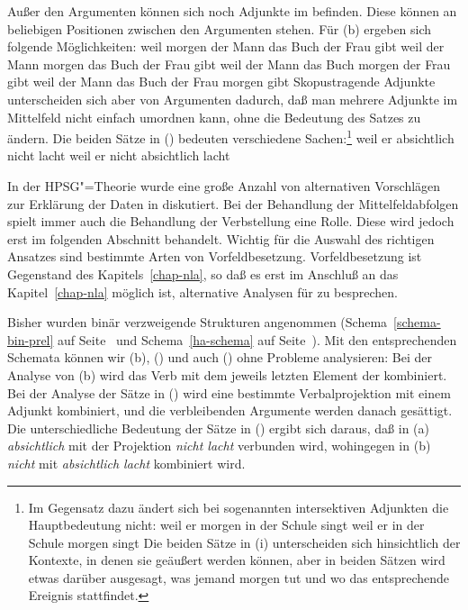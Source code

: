Außer den Argumenten können sich noch Adjunkte im \mf befinden. Diese können
an beliebigen Positionen zwischen den Argumenten stehen. Für (b) ergeben
sich \zb folgende Möglichkeiten:
\eal
\label{bsp-adj-mf}
\ex weil morgen der Mann das Buch der Frau gibt
\ex weil der Mann morgen das Buch der Frau gibt
\ex weil der Mann das Buch morgen der Frau gibt
\ex weil der Mann das Buch der Frau morgen gibt
\zl
Skopustragende Adjunkte unterscheiden sich aber von Argumenten dadurch, daß man mehrere
Adjunkte im Mittelfeld nicht einfach umordnen kann, ohne die Bedeutung des Satzes zu ändern.
Die beiden Sätze in () bedeuten verschiedene Sachen:\footnote{
  Im Gegensatz dazu ändert sich bei sogenannten intersektiven Adjunkten die Hauptbedeutung nicht:
\eal
\ex weil er morgen in der Schule singt
\ex weil er in der Schule morgen singt
\zl
Die beiden Sätze in (i) unterscheiden sich hinsichtlich der Kontexte, in denen sie geäußert
werden können, aber in beiden Sätzen wird etwas darüber ausgesagt, was jemand morgen tut und wo
das entsprechende Ereignis stattfindet.%
}
\eal{}
\label{bsp-absichtlich-nicht}
\ex weil er absichtlich nicht lacht
\ex weil er nicht absichtlich lacht
\zl

\noindent
In der HPSG"=Theorie wurde eine große Anzahl von alternativen Vorschlägen zur Erklärung der
Daten in  diskutiert. Bei der Behandlung der Mittelfeldabfolgen
spielt immer auch die Behandlung der Verbstellung eine Rolle. Diese wird jedoch erst im
folgenden Abschnitt behandelt. Wichtig für die Auswahl des richtigen Ansatzes sind
bestimmte Arten von Vorfeldbesetzung. Vorfeldbesetzung ist Gegenstand des Kapitels~\ref{chap-nla},
so daß es erst im Anschluß an das Kapitel~\ref{chap-nla} möglich ist, alternative
Analysen für  zu besprechen.

Bisher wurden binär verzweigende Strukturen angenommen (Schema~\ref{schema-bin-prel} auf
Seite~\pageref{schema-bin-prel} und Schema~\ref{ha-schema} auf Seite~\pageref{ha-schema}).
Mit den entsprechenden Schemata können wir (b), () und auch ()
ohne Probleme analysieren: Bei der Analyse von (b) wird das Verb mit dem jeweils
letzten Element der \subcatl kombiniert. Bei der Analyse der Sätze in ()
wird eine bestimmte Verbalprojektion mit einem Adjunkt kombiniert, und die verbleibenden
Argumente werden danach gesättigt. Die unterschiedliche Bedeutung der Sätze in ()
ergibt sich daraus, daß in (a) \emph{absichtlich} mit der Projektion \emph{nicht lacht} verbunden
wird, wohingegen in (b) \emph{nicht} mit \emph{absichtlich lacht} kombiniert wird.

